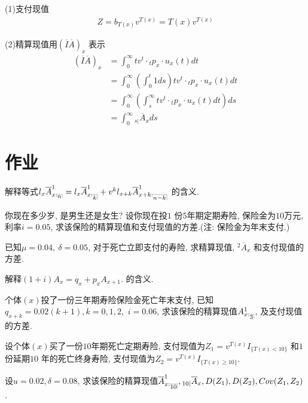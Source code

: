 \documentclass[a4paper,10pt]{ctexbook}
\makeatletter
\DeclareRobustCommand{\annu}[1]{_{%
    \def\arraystretch{0}%
    \setlength\arraycolsep{1pt}%
    \setlength\arrayrulewidth{.2pt}%
    \begin{array}[b]{@{}c|}\hline
        \\[\arraycolsep]%
        \scriptstyle #1%
    \end{array}%
}}
\makeatother
\begin{document}
(1)支付现值
\begin{align*}
    Z=b_{T(x)}v^{T(x)}=T(x)v^{T(x)}
\end{align*}

(2)精算现值用$\left( \overline{I}\overline{A} \right) _x$ 表示
\begin{align*}
    \left( \overline{I}\overline{A} \right) _x & =\int_0^{\infty}t v^t\cdot {}_tp_x\cdot u_x(t)dt                    \\
                                               & =\int_0^{\infty }(\int_0^t1ds)t v^t\cdot {}_tp_x\cdot u_x(t)dt      \\
                                               & =\int_0^{\infty}(\int_s^{\infty}t v^t\cdot {}_tp_x\cdot u_x(t)dt)ds \\
                                               & =\int_0^{\infty} {}_{s|}\overline{A}_x ds
\end{align*}
\section{作业}
\begin{exs}
    解释等式$l_x\overline{A}_{x:\annu{n}}^1=l_x\overline{A}_{x:\annu{k}}^1+v^kl_{x+k}\overline{A}_{x+k:\annu{n-k}}^1$ 的含义.
\end{exs}

\begin{exs}
    你现在多少岁, 是男生还是女生? 设你现在投$1$ 份$5$年期定期寿险, 保险金为$10$万元, 利率$i = 0.05$, 求该保险的精算现值和支付现值的方差.(注: 保险金为年末支付.)
\end{exs}

\begin{exs}
    已知$\mu = 0.04, ~\delta = 0.05$, 对于死亡立即支付的寿险, 求精算现值, ${}^2\overline{A}_x$ 和支付现值的方差.
\end{exs}

\begin{exs}
    解释$(1+i){A}_x = q_x + p_x {A}_{x+1}. $ 的含义.
\end{exs}

\begin{exs}
    个体$(x)$投了一份三年期寿险保险金死亡年末支付, 已知$q_{x+k}=0.02(k+1),k=0,1,2, $ $i=0.06$, 求该保险的精算现值${A}_{x:\annu{3}}^1$, 及支付现值的方差.
\end{exs}

\begin{exs}
    设个体$(x)$买了一份$10$年期死亡定期寿险, 支付现值为$Z_1=v^{T(x)}I_{\{T(x)<10\}}$ 和$1$ 份延期$10$ 年的死亡终身寿险, 支付现值为$Z_2=v^{T(x)}I_{\{T(x)\ge 10\}}$.

    设$u=0.02, \delta=0.08$, 求该保险的精算现值$\overline {A}_{x:\annu{10}}^1, {}_{10|}\overline {A}_{x}, D(Z_1), D(Z_2), Cov(Z_1,Z_2)$.
\end{exs}
\end{document}
